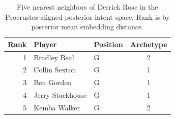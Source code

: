 \begin{table}[htbp]
  \centering\small
  \begin{tabular}{rllc}
    \toprule
    Rank & Player & Position & Archetype \\
    \midrule
    1 & Bradley Beal & G & 2 \\
    2 & Collin Sexton & G & 1 \\
    3 & Ben Gordon & G & 1 \\
    4 & Jerry Stackhouse & G & 1 \\
    5 & Kemba Walker & G & 2 \\
    \bottomrule
  \end{tabular}
  \caption{Five nearest neighbors of Derrick Rose in the Procrustes-aligned posterior latent space. Rank is by posterior mean embedding distance.}
  \label{tab:Derrick_Rose_neighbors}
\end{table}

